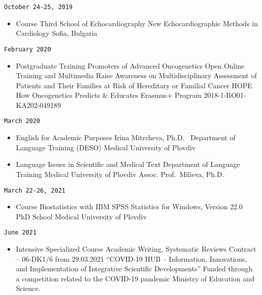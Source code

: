 \documentclass[
  12pt,
  letterpaper,
  DIV=11,
  numbers=noendperiod]{scrartcl}
\providecommand{\tightlist}{%
  \setlength{\itemsep}{0pt}\setlength{\parskip}{0pt}}\usepackage{longtable,booktabs,array}
\begin{document}
\texttt{October\ 24-25,\ 2019}

\begin{itemize}
\tightlist
\item
  Course \textbar{} Third School of Echocardiography \textbar{} New
  Echocardiographic Methods in Cardiology \textbar{} Sofia, Bulgaria
\end{itemize}

\texttt{February\ 2020}

\begin{itemize}
\tightlist
\item
  Postgraduate Training \textbar{} Promoters of Advanced Oncogenetics
  \textbar{} Open Online Training and Multimedia Raise Awareness on
  Multidisciplinary Assessment of Patients and Their Families at Risk of
  Hereditary or Familial Cancer \textbar{} HOPE How Oncogenetics
  Predicts \& Educates Erasmus+ Program 2018-1-RO01-KA202-049189
\end{itemize}

\texttt{March\ 2020}

\begin{itemize}
\item
  English for Academic Purposes \textbar{} Irina Mitrcheva,
  Ph.D.~\textbar{} Department of Language Training (DESO) \textbar{}
  Medical University of Plovdiv
\item
  Language Issues in Scientific and Medical Text \textbar{} Department
  of Language Training \textbar{} Medical University of Plovdiv
  \textbar{} Assoc. Prof.~Milieva, Ph.D.
\end{itemize}

\texttt{March\ 22-26,\ 2021}

\begin{itemize}
\tightlist
\item
  Course \textbar{} Biostatistics with IBM SPSS Statistics for Windows,
  Version 22.0 \textbar{} PhD School \textbar{} Medical University of
  Plovdiv
\end{itemize}

\texttt{June\ 2021}

\begin{itemize}
\tightlist
\item
  Intensive Specialized Course \textbar{} Academic Writing, Systematic
  Reviews \textbar{} Contract -- 06-DK1/6 from 29.03.2021 \textbar{}
  ``COVID-19 HUB -- Information, Innovations, and Implementation of
  Integrative Scientific Developments'' \textbar{} Funded through a
  competition related to the COVID-19 pandemic \textbar{} Ministry of
  Education and Science.
\end{itemize}
\end{document}
